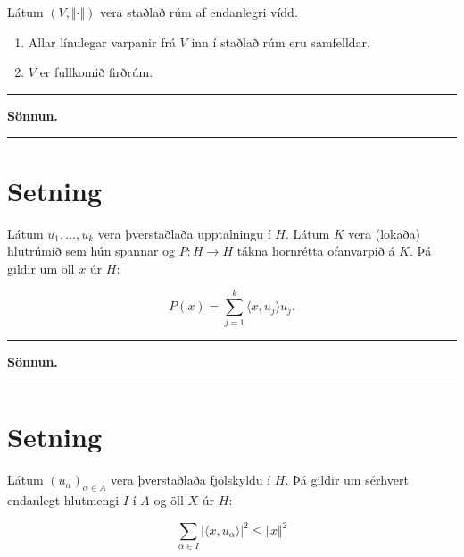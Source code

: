 \documentclass[]{book}
\providecommand{\tightlist}{%
  \setlength{\itemsep}{0pt}\setlength{\parskip}{0pt}}
\begin{document}
Látum \((V,\Vert\cdot\Vert)\) vera staðlað rúm af endanlegri vídd.

\begin{enumerate}
\def\labelenumi{\arabic{enumi}.}
\tightlist
\item
  Allar línulegar varpanir frá \(V\) inn í staðlað rúm eru samfelldar.
\item
  \(V\) er fullkomið firðrúm.
\end{enumerate}

\begin{center}\rule{0.5\linewidth}{\linethickness}\end{center}

\textbf{Sönnun.}

\begin{center}\rule{0.5\linewidth}{\linethickness}\end{center}

\hypertarget{setning-85}{%
\section*{Setning}\label{setning-85}}

Látum \(u_1, \dots, u_k\) vera þverstaðlaða upptalningu í \(H\). Látum \(K\) vera (lokaða) hlutrúmið sem hún spannar og \(P:H\rightarrow H\) tákna hornrétta ofanvarpið á \(K\). Þá gildir um öll \(x\) úr \(H\):

\[
P(x) = \sum_{j=1}^k\langle x,u_j\rangle u_j.
\]

\begin{center}\rule{0.5\linewidth}{\linethickness}\end{center}

\textbf{Sönnun.}

\begin{center}\rule{0.5\linewidth}{\linethickness}\end{center}

\hypertarget{setning-86}{%
\section*{Setning}\label{setning-86}}

Látum \((u_\alpha)_{\alpha\in A}\) vera þverstaðlaða fjölskyldu í \(H\). Þá gildir um sérhvert endanlegt hlutmengi \(I\) í \(A\) og öll \(X\) úr \(H\):

\[
\sum_{\alpha\in I}\vert\langle x,u_\alpha\rangle\vert^2\leq\Vert x\Vert^2
\]
\end{document}

